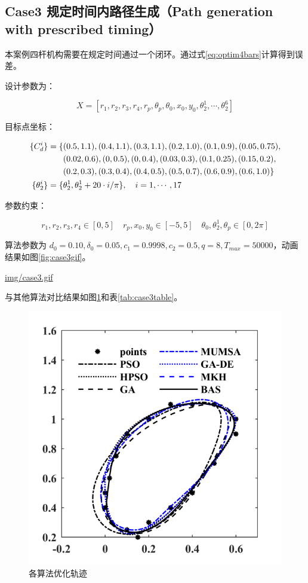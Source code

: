 \documentclass[]{ctexbook}
\begin{document}
\subsection{Case3 规定时间内路径生成（Path generation with prescribed
timing）}\label{case3-path-generation-with-prescribed-timing}

本案例四杆机构需要在规定时间通过一个闭环。通过式\eqref{eq:optim4bars}计算得到误差。

设计参数为：

\[
X = [r_1,r_2,r_3,r_4,r_p,\theta_p,\theta_0,x_0,y_0,\theta_2^1,\cdots,\theta_2^6]
\]

目标点坐标：

\begin{align}
\{C_d^i\} = \{&(0.5,1.1),(0.4,1.1),(0.3,1.1),(0.2,1.0),(0.1,0.9),(0.05,0.75), \notag \\
&(0.02,0.6),(0,0.5),(0,0.4),(0.03,0.3),(0.1,0.25),(0.15,0.2), \notag\\
&(0.2,0.3),(0.3,0.4),(0.4,0.5),(0.5,0.7),(0.6,0.9),(0.6,1.0)\} \notag\\
\{\theta_2^i\}=\{&\theta_2^1,\theta_2^1+20\cdot i/\pi\},\quad i = 1,\cdots,17 \notag \\
\end{align}

参数约束：

\[
r_1,r_2,r_3,r_4\in[0,5]\quad r_p,x_0,y_0\in[-5,5]\quad \theta_0,\theta_2^1,\theta_p\in[0,2\pi]
\]

算法参数为
\(d_0 = 0.10,\delta_0=0.05,c_1=0.9998,c_2=0.5,q=8,T_{max}=50000\)，动画结果如图\ref{fig:case3gif}。

\url{img/case3.gif}

与其他算法对比结果如图\ref{fig:case3png}和表\ref{tab:case3table}。

\begin{figure}

{\centering \includegraphics[width=0.5\linewidth]{img/case3png} 

}

\caption{各算法优化轨迹}\label{fig:case3png}
\end{figure}
\end{document}
